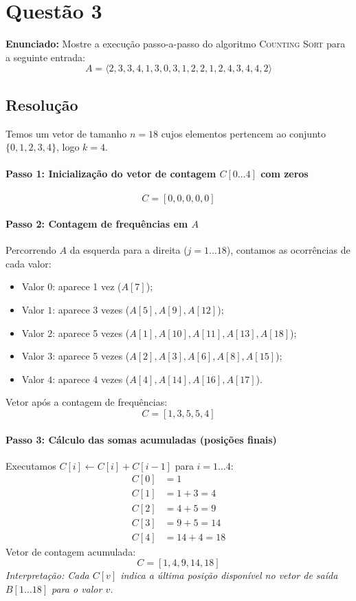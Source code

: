 \documentclass[11pt,a4paper]{article}
\begin{document}
\section*{Questão 3}
\textbf{Enunciado:} Mostre a execução passo-a-passo do algoritmo \textsc{Counting Sort} para a seguinte entrada:
\[
A = \langle 2, 3, 3, 4, 1, 3, 0, 3, 1, 2, 2, 1, 2, 4, 3, 4, 4, 2 \rangle
\]

\subsection*{Resolução}
Temos um vetor de tamanho $n = 18$ cujos elementos pertencem ao conjunto $\{0, 1, 2, 3, 4\}$, logo $k = 4$.

\paragraph{Passo 1: Inicialização do vetor de contagem $C[0 \dots 4]$ com zeros}
\[
C = [0, 0, 0, 0, 0]
\]

\paragraph{Passo 2: Contagem de frequências em $A$}
Percorrendo $A$ da esquerda para a direita ($j = 1 \dots 18$), contamos as ocorrências de cada valor:
\begin{itemize}
    \item Valor $0$: aparece 1 vez ($A[7]$);
    \item Valor $1$: aparece 3 vezes ($A[5], A[9], A[12]$);
    \item Valor $2$: aparece 5 vezes ($A[1], A[10], A[11], A[13], A[18]$);
    \item Valor $3$: aparece 5 vezes ($A[2], A[3], A[6], A[8], A[15]$);
    \item Valor $4$: aparece 4 vezes ($A[4], A[14], A[16], A[17]$).
\end{itemize}
Vetor após a contagem de frequências:
\[
C = [1, 3, 5, 5, 4]
\]

\paragraph{Passo 3: Cálculo das somas acumuladas (posições finais)}
Executamos $C[i] \leftarrow C[i] + C[i-1]$ para $i = 1 \dots 4$:
\begin{align*}
    C[0] &= 1 \\
    C[1] &= 1 + 3 = 4 \\
    C[2] &= 4 + 5 = 9 \\
    C[3] &= 9 + 5 = 14 \\
    C[4] &= 14 + 4 = 18
\end{align*}
Vetor de contagem acumulada:
\[
C = [1, 4, 9, 14, 18]
\]
\textit{Interpretação: Cada $C[v]$ indica a última posição disponível no vetor de saída $B[1 \dots 18]$ para o valor $v$.}
\end{document}
